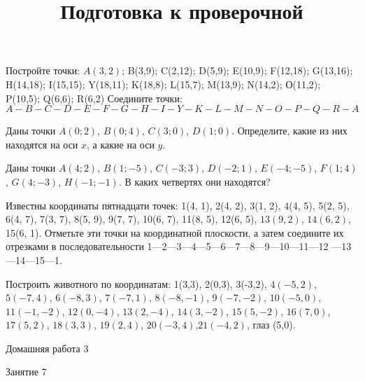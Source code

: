 \begin{class}[number=6]
	\begin{listofex}
		\item Постройте точки:
		\( A(3,2) \); B(3,9); C(2,12); D(5,9); E(10,9);
		F(12,18); G(13,16); H(14,18); I(15,15);
		Y(18,11); K(18,8); L(15,7); M(13,9);
		N(14,2); О(11,2); P(10,5); Q(6,6); R(6,2) 
		Соедините точки:
		\( A-B-C-D-E-F-G-H-I-Y-K-L-M-N-O-P-
		Q-R-A \)
		\item Даны точки \( A (0;2) \), \( B (0;4) \), \( C (3;0) \), \( D (1;0) \). Определите, какие из них находятся на оси \( x \), а какие на оси \( y \).
		\item Даны точки \( A(4;2) \), \( B(1;-5) \), \( C(-3;3) \), \( D(-2;1) \), \( E(-4;-5) \), \( F(1;4) \), \( G(4;-3) \), \( H(-1;-1) \). В каких четвертях они находятся?
		\item Известны координаты пятнадцати точек: 1(4, 1), 2(4, 2), 3(1, 2), 4(4, 5), 5(2, 5), 6(4, 7), 7(3, 7), 8(5, 9), 9(7, 7), 10(6, 7), 11(8, 5), 12(6, 5), \( 13(9, 2) \), \( 14(6, 2) \), 15(6, 1). Отметьте эти точки на координатной плоскости, а затем соедините их отрезками в последовательности 1—2—3—4—5—6—7—8—9—10—11—12 —13—14—15—1. 
		\item Построить животного по координатам:
		1(3,3), 2(0,3), 3(-3,2), \( 4(-5,2) \), \(  5(-7,4) \), \( 6(-8,3) \), \( 7(-7,1) \), \( 8(-8,-1) \), \( 9(-7,-2) \), \( 10(-5,0) \), \( 11(-1,-2) \), \( 12(0,-4) \), \( 13(2,-4) \), \( 14(3,-2) \), \( 15(5,-2) \), \( 16(7,0) \), \( 17(5,2) \), \( 18(3,3) \), \( 19(2,4) \), \( 20(-3,4) \),\(  21(-4,2) \), глаз (5,0).
	\end{listofex}
\end{class}

\begin{homework}[number=3]
	\begin{listofex}
		\item Домашняя работа 3
	\end{listofex}
\end{homework}

\begin{class}[number=7]
	\title{Подготовка к проверочной}
	\begin{listofex}
		\item Занятие 7
	\end{listofex}
\end{class}

